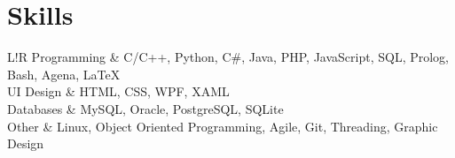 \documentclass{article}
\newcommand\VRule{\color{lightgray}\vrule width 0.4pt}
\begin{document}
\section*{Skills}
\begin{tabular}{L!{\VRule}R}
	Programming & C/C++, Python, C\#, Java, PHP, JavaScript, SQL, Prolog, Bash, Agena, \LaTeX \vspace{4pt} \\
	UI Design   & HTML, CSS, WPF, XAML \vspace{4pt} \\
	Databases   & MySQL, Oracle, PostgreSQL, SQLite \vspace{4pt} \\
	Other       & Linux, Object Oriented Programming, Agile, Git, Threading, Graphic Design
\end{tabular}
\end{document}
